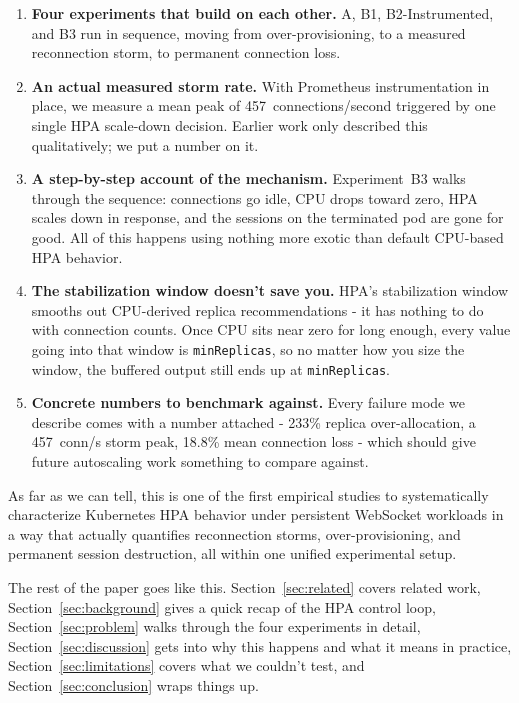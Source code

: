 \documentclass[twocolumn]{svjour3}
\begin{document}
\begin{enumerate}[leftmargin=*]
\item \textbf{Four experiments that build on each other.} A, B1, B2-Instrumented,
  and B3 run in sequence, moving from over-provisioning, to a measured reconnection
  storm, to permanent connection loss.

\item \textbf{An actual measured storm rate.} With Prometheus instrumentation in
  place, we measure a mean peak of 457~connections/second triggered by one single HPA
  scale-down decision. Earlier work only described this qualitatively; we put a
  number on it.

\item \textbf{A step-by-step account of the mechanism.} Experiment~B3 walks
  through the sequence: connections go idle, CPU drops toward zero, HPA scales
  down in response, and the sessions on the terminated pod are gone for good. All of
  this happens using nothing more exotic than default CPU-based HPA behavior.

\item \textbf{The stabilization window doesn't save you.} HPA's stabilization
  window smooths out CPU-derived replica recommendations - it has nothing to do
  with connection counts. Once CPU sits near zero for long enough, every value
  going into that window is \texttt{minReplicas}, so no matter how you size the
  window, the buffered output still ends up at \texttt{minReplicas}.

\item \textbf{Concrete numbers to benchmark against.} Every failure mode we
  describe comes with a number attached - 233\% replica over-allocation, a 457~conn/s
  storm peak, 18.8\% mean connection loss - which should give future autoscaling
  work something to compare against.
\end{enumerate}

As far as we can tell, this is one of the first empirical studies to systematically
characterize Kubernetes HPA behavior under persistent WebSocket workloads in a way
that actually quantifies reconnection storms, over-provisioning, and permanent
session destruction, all within one unified experimental setup.

The rest of the paper goes like this. Section~\ref{sec:related} covers related
work, Section~\ref{sec:background} gives a quick recap of the HPA control loop,
Section~\ref{sec:problem} walks through the four experiments in detail,
Section~\ref{sec:discussion} gets into why this happens and what it means in
practice, Section~\ref{sec:limitations} covers what we couldn't test, and
Section~\ref{sec:conclusion} wraps things up.
\end{document}
